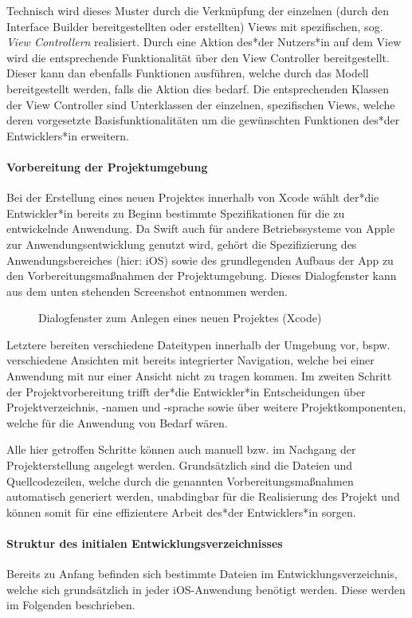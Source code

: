Technisch wird dieses Muster durch die Verknüpfung der einzelnen (durch den Interface Builder bereitgestellten oder erstellten) Views mit spezifischen, sog. \textit{View Controllern} realisiert. Durch eine Aktion des*der Nutzers*in auf dem View wird die entsprechende Funktionalität über den View Controller bereitgestellt. Dieser kann dan ebenfalls Funktionen ausführen, welche durch das Modell bereitgestellt werden, falls die Aktion dies bedarf. Die entsprechenden Klassen der View Controller sind Unterklassen der einzelnen, spezifischen Views, welche deren vorgesetzte Basisfunktionalitäten um die gewünschten Funktionen des*der Entwicklers*in erweitern.

\paragraph{Vorbereitung der Projektumgebung}
Bei der Erstellung eines neuen Projektes innerhalb von Xcode wählt der*die Entwickler*in bereits zu Beginn bestimmte Spezifikationen für die zu entwickelnde Anwendung. Da Swift auch für andere Betriebssysteme von Apple zur Anwendungsentwicklung genutzt wird, gehört die Spezifizierung des Anwendungsbereiches (hier: iOS) sowie des grundlegenden Aufbaus der App zu den Vorbereitungsmaßnahmen der Projektumgebung. Dieses Dialogfenster kann aus dem unten stehenden Screenshot entnommen werden.

\begin{figure}
	\centering
	\caption{Dialogfenster zum Anlegen eines neuen Projektes (Xcode)}
\end{figure}

Letztere bereiten verschiedene Dateitypen innerhalb der Umgebung vor, bspw. verschiedene Ansichten mit bereits integrierter Navigation, welche bei einer Anwendung mit nur einer Ansicht nicht zu tragen kommen. Im zweiten Schritt der Projektvorbereitung trifft der*die Entwickler*in Entscheidungen über Projektverzeichnis, -namen und -sprache sowie über weitere Projektkomponenten, welche für die Anwendung von Bedarf wären.

Alle hier getroffen Schritte können auch manuell bzw. im Nachgang der Projekterstellung angelegt werden. Grundsätzlich sind die Dateien und Quellcodezeilen, welche durch die genannten Vorbereitungsmaßnahmen automatisch generiert werden, unabdingbar für die Realisierung des Projekt und können somit für eine effizientere Arbeit des*der Entwicklers*in sorgen.

\paragraph{Struktur des initialen Entwicklungsverzeichnisses}
Bereits zu Anfang befinden sich bestimmte Dateien im Entwicklungsverzeichnis, welche sich grundsätzlich in jeder iOS-Anwendung benötigt werden. Diese werden im Folgenden beschrieben.

